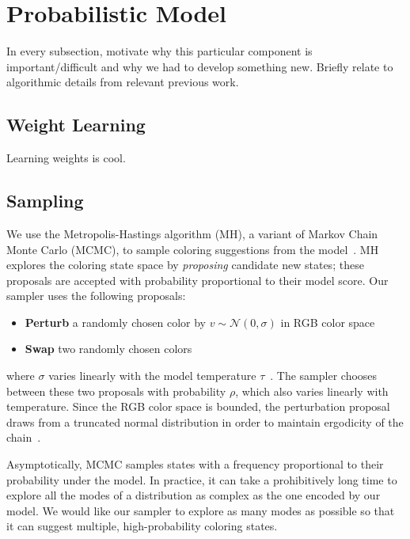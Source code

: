\section{Probabilistic Model}
\label{sec:model}

In every subsection, motivate why this particular component is important/difficult and why we had to develop something new. Briefly relate to algorithmic details from relevant previous work.



\subsection{Weight Learning}
\label{sec:weights}
Learning weights is cool.

\subsection{Sampling}
\label{sec:sampling}

We use the Metropolis-Hastings algorithm (MH), a variant of Markov Chain Monte Carlo (MCMC), to sample coloring suggestions from the model~\cite{Metropolis,Hastings}. MH explores the coloring state space by \emph{proposing} candidate new states; these proposals are accepted with probability proportional to their model score. Our sampler uses the following proposals:
\begin{itemize}
	\item{\textbf{Perturb} a randomly chosen color by $v \sim \mathcal{N}(0, \sigma)$ in RGB color space}
	\item{\textbf{Swap} two randomly chosen colors}
\end{itemize}
where $\sigma$ varies linearly with the model temperature $\tau$~. The sampler chooses between these two proposals with probability $\rho$, which also varies linearly with temperature. Since the RGB color space is bounded, the perturbation proposal draws from a truncated normal distribution in order to maintain ergodicity of the chain~\cite{TruncatedGaussians}.

Asymptotically, MCMC samples states with a frequency proportional to their probability under the model. In practice, it can take a prohibitively long time to explore all the modes of a distribution as complex as the one encoded by our model. We would like our sampler to explore as many modes as possible so that it can suggest multiple, high-probability coloring states.

